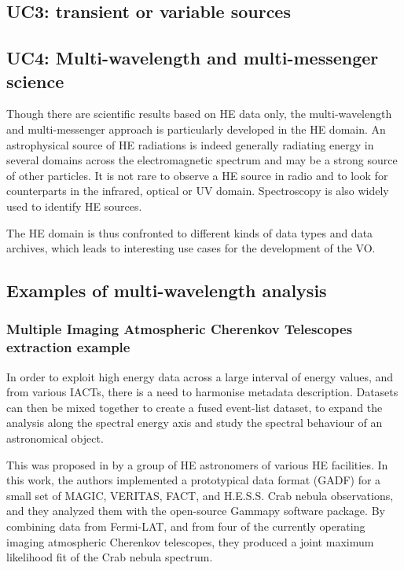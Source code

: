 \documentclass[11pt,a4paper]{ivoa}
\begin{document}
\subsection{UC3: transient or variable sources}




\subsection{UC4: Multi-wavelength and multi-messenger science}

Though there are scientific results based on HE data only, the multi-wavelength and multi-messenger approach is particularly developed in the HE domain. An astrophysical source of HE radiations is indeed generally radiating energy in several domains across the electromagnetic spectrum and may be a strong source of other particles. It is not rare to observe a HE source in radio and to look for counterparts in the infrared, optical or UV domain. Spectroscopy is also widely used to identify HE sources.

The HE domain is thus confronted to different kinds of data types and data archives, which leads to interesting use cases for the development of the VO.



\subsection{Examples of multi-wavelength analysis}

\subsubsection{Multiple Imaging Atmospheric Cherenkov Telescopes extraction example}

In order to exploit high energy data across a large interval of energy values, and from various IACTs, there is a need to harmonise metadata description.
Datasets can then be mixed together to create a fused event-list dataset, to expand the analysis along the spectral energy axis and study the spectral behaviour of an astronomical object.

This was proposed in \citep{2019A&A...625A..10N} by a group of HE astronomers of various HE facilities.
In this work, the authors implemented a prototypical data format (GADF) for a small set of MAGIC, VERITAS, FACT, and H.E.S.S. Crab nebula observations, and they analyzed them with the open-source Gammapy software package. By combining data from Fermi-LAT, and from four of the currently operating imaging atmospheric Cherenkov telescopes, they produced a joint maximum likelihood fit of the Crab nebula spectrum.
\end{document}
